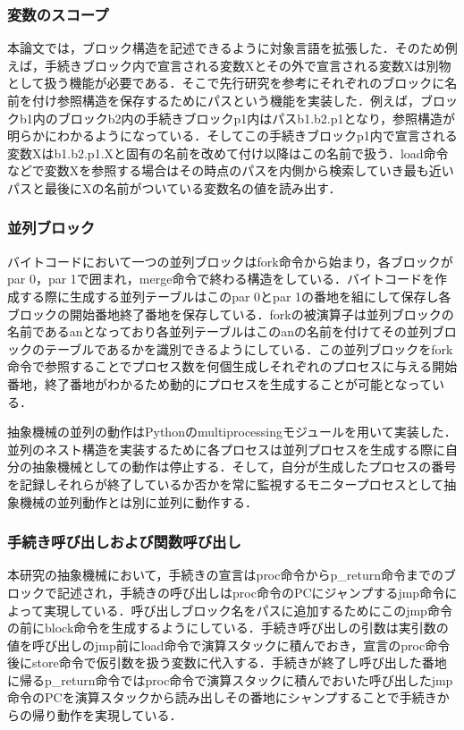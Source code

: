 \documentclass[submit,PRO]{ipsj}
\begin{document}
\subsubsection{変数のスコープ}

本論文では，ブロック構造を記述できるように対象言語を拡張した．そのため例えば，手続きブロック内で宣言される変数Xとその外で宣言される変数Xは別物として扱う機能が必要である．そこで先行研究を参考にそれぞれのブロックに名前を付け参照構造を保存するためにパスという機能を実装した．例えば，ブロックb1内のブロックb2内の手続きブロックp1内はパスb1.b2.p1となり，参照構造が明らかにわかるようになっている．そしてこの手続きブロックp1内で宣言される変数Xはb1.b2.p1.Xと固有の名前を改めて付け以降はこの名前で扱う．load命令などで変数Xを参照する場合はその時点のパスを内側から検索していき最も近いパスと最後にXの名前がついている変数名の値を読み出す．


\subsubsection{並列ブロック}

バイトコードにおいて一つの並列ブロックはfork命令から始まり，各ブロックがpar 0，par 1で囲まれ，merge命令で終わる構造をしている．バイトコードを作成する際に生成する並列テーブルはこのpar 0とpar 1の番地を組にして保存し各ブロックの開始番地終了番地を保存している．forkの被演算子は並列ブロックの名前であるanとなっており各並列テーブルはこのanの名前を付けてその並列ブロックのテーブルであるかを識別できるようにしている．この並列ブロックをfork命令で参照することでプロセス数を何個生成しそれぞれのプロセスに与える開始番地，終了番地がわかるため動的にプロセスを生成することが可能となっている．

抽象機械の並列の動作はPythonのmultiprocessingモジュールを用いて実装した．並列のネスト構造を実装するために各プロセスは並列プロセスを生成する際に自分の抽象機械としての動作は停止する．そして，自分が生成したプロセスの番号を記録しそれらが終了しているか否かを常に監視するモニタープロセスとして抽象機械の並列動作とは別に並列に動作する．


\subsubsection{手続き呼び出しおよび関数呼び出し}

本研究の抽象機械において，手続きの宣言はproc命令からp\_return命令までのブロックで記述され，手続きの呼び出しはproc命令のPCにジャンプするjmp命令によって実現している．呼び出しブロック名をパスに追加するためにこのjmp命令の前にblock命令を生成するようにしている．手続き呼び出しの引数は実引数の値を呼び出しのjmp前にload命令で演算スタックに積んでおき，宣言のproc命令後にstore命令で仮引数を扱う変数に代入する．手続きが終了し呼び出した番地に帰るp\_return命令ではproc命令で演算スタックに積んでおいた呼び出したjmp命令のPCを演算スタックから読み出しその番地にシャンプすることで手続きからの帰り動作を実現している．
\end{document}
